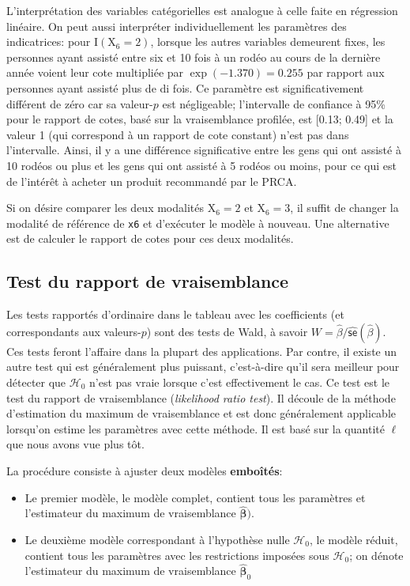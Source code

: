 \documentclass[
  11pt,
  letterpaper,
]{scrbook}
\providecommand{\tightlist}{%
  \setlength{\itemsep}{0pt}\setlength{\parskip}{0pt}}\usepackage{longtable,booktabs,array}
\theoremstyle{definition}
\theoremstyle{remark}
\begin{document}
L'interprétation des variables catégorielles est analogue à celle faite
en régression linéaire. On peut aussi interpréter individuellement les
paramètres des indicatrices: pour \(\mathrm{I}(\mathrm{X}_6=2)\),
lorsque les autres variables demeurent fixes, les personnes ayant
assisté entre six et 10 fois à un rodéo au cours de la dernière année
voient leur cote multipliée par \(\exp(-1.370)=0.255\) par rapport aux
personnes ayant assisté plus de di fois. Ce paramètre est
significativement différent de zéro car sa valeur-\(p\) est négligeable;
l'intervalle de confiance à 95\% pour le rapport de cotes, basé sur la
vraisemblance profilée, est {[}0.13; 0.49{]} et la valeur 1 (qui
correspond à un rapport de cote constant) n'est pas dans l'intervalle.
Ainsi, il y a une différence significative entre les gens qui ont
assisté à 10 rodéos ou plus et les gens qui ont assisté à 5 rodéos ou
moins, pour ce qui est de l'intérêt à acheter un produit recommandé par
le PRCA.

Si on désire comparer les deux modalités \(\mathrm{X}_6=2\) et
\(\mathrm{X}_6=3\), il suffit de changer la modalité de référence de
\texttt{x6} et d'exécuter le modèle à nouveau. Une alternative est de
calculer le rapport de cotes pour ces deux modalités.

\subsection{Test du rapport de
vraisemblance}\label{test-du-rapport-de-vraisemblance}

Les tests rapportés d'ordinaire dans le tableau avec les coefficients
(et correspondants aux valeurs-\(p\)) sont des tests de Wald, à savoir
\(W = \widehat{\beta}/\widehat{\mathsf{se}}(\widehat{\beta})\). Ces
tests feront l'affaire dans la plupart des applications. Par contre, il
existe un autre test qui est généralement plus puissant, c'est-à-dire
qu'il sera meilleur pour détecter que \(\mathscr{H}_0\) n'est pas vraie
lorsque c'est effectivement le cas. Ce test est le test du rapport de
vraisemblance (\emph{likelihood ratio test}). Il découle de la méthode
d'estimation du maximum de vraisemblance et est donc généralement
applicable lorsqu'on estime les paramètres avec cette méthode. Il est
basé sur la quantité \(\ell\) que nous avons vue plus tôt.

La procédure consiste à ajuster deux modèles \textbf{emboîtés}:

\begin{itemize}
\tightlist
\item
  Le premier modèle, le modèle complet, contient tous les paramètres et
  l'estimateur du maximum de vraisemblance
  \(\widehat{\boldsymbol{\beta}})\).
\item
  Le deuxième modèle correspondant à l'hypothèse nulle
  \(\mathscr{H}_0\), le modèle réduit, contient tous les paramètres avec
  les restrictions imposées sous \(\mathscr{H}_0\); on dénote
  l'estimateur du maximum de vraisemblance
  \(\widehat{\boldsymbol{\beta}}_0\)
\end{itemize}
\end{document}
